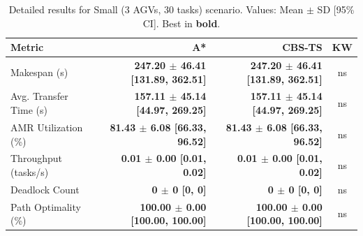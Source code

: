 \begin{table}[htbp]
\centering
\caption{Detailed results for Small (3 AGVs, 30 tasks) scenario. Values: Mean $\pm$ SD [95\% CI]. Best in \textbf{bold}.}
\label{tab:detail_s1_small}
\small
\begin{tabular}{@{}lrrc@{}}
\toprule
\textbf{Metric} & \textbf{A*} & \textbf{CBS-TS} & \textbf{KW} \\
\midrule
Makespan (s) & \textbf{247.20 $\pm$ 46.41 [131.89, 362.51]} & \textbf{247.20 $\pm$ 46.41 [131.89, 362.51]} & ns \\
Avg. Transfer Time (s) & \textbf{157.11 $\pm$ 45.14 [44.97, 269.25]} & \textbf{157.11 $\pm$ 45.14 [44.97, 269.25]} & ns \\
AMR Utilization (\%) & \textbf{81.43 $\pm$ 6.08 [66.33, 96.52]} & \textbf{81.43 $\pm$ 6.08 [66.33, 96.52]} & ns \\
Throughput (tasks/s) & \textbf{0.01 $\pm$ 0.00 [0.01, 0.02]} & \textbf{0.01 $\pm$ 0.00 [0.01, 0.02]} & ns \\
Deadlock Count & \textbf{0 $\pm$ 0 [0, 0]} & \textbf{0 $\pm$ 0 [0, 0]} & ns \\
Path Optimality (\%) & \textbf{100.00 $\pm$ 0.00 [100.00, 100.00]} & \textbf{100.00 $\pm$ 0.00 [100.00, 100.00]} & ns \\
\bottomrule
\end{tabular}
\end{table}